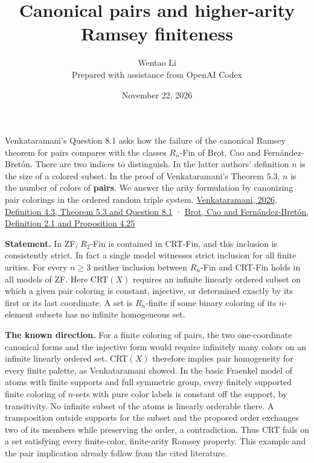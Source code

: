 \documentclass[11pt]{article}
\author{Wentao Li\\\small Prepared with assistance from OpenAI Codex}
\date{November 22, 2026}
\title{Canonical pairs and higher-arity Ramsey finiteness}
\begin{document}
\maketitle
Venkataramani's Question 8.1 asks how the failure of the canonical Ramsey theorem for pairs compares with the classes \(R_n\)-Fin of Brot, Cao and Fernández-Bretón. There are two indices to distinguish. In the latter authors' definition \(n\) is the size of a colored subset. In the proof of Venkataramani's Theorem 5.3, \(n\) is the number of colors of \textbf{pairs}. We answer the arity formulation by canonizing pair colorings in the ordered random triple system. \href{https://arxiv.org/abs/2607.22196}{Venkataramani, 2026, Definition 4.3, Theorem 5.3 and Question 8.1} · \href{https://arxiv.org/abs/1910.11025}{Brot, Cao and Fernández-Bretón, Definition 2.1 and Proposition 4.25}

\textbf{Statement.} In ZF, \(R_2\)-Fin is contained in CRT-Fin, and this inclusion is consistently strict. In fact a single model witnesses strict inclusion for all finite arities. For every \(n\ge3\) neither inclusion between \(R_n\)-Fin and CRT-Fin holds in all models of ZF. Here CRT\((X)\) requires an infinite linearly ordered subset on which a given pair coloring is constant, injective, or determined exactly by its first or its last coordinate. A set is \(R_n\)-finite if some binary coloring of its \(n\)-element subsets has no infinite homogeneous set.

\textbf{The known direction.} For a finite coloring of pairs, the two one-coordinate canonical forms and the injective form would require infinitely many colors on an infinite linearly ordered set. CRT\((X)\) therefore implies pair homogeneity for every finite palette, as Venkataramani showed. In the basic Fraenkel model of atoms with finite supports and full symmetric group, every finitely supported finite coloring of \(n\)-sets with pure color labels is constant off the support, by transitivity. No infinite subset of the atoms is linearly orderable there. A transposition outside supports for the subset and the proposed order exchanges two of its members while preserving the order, a contradiction. Thus CRT fails on a set satisfying every finite-color, finite-arity Ramsey property. This example and the pair implication already follow from the cited literature.
\end{document}
